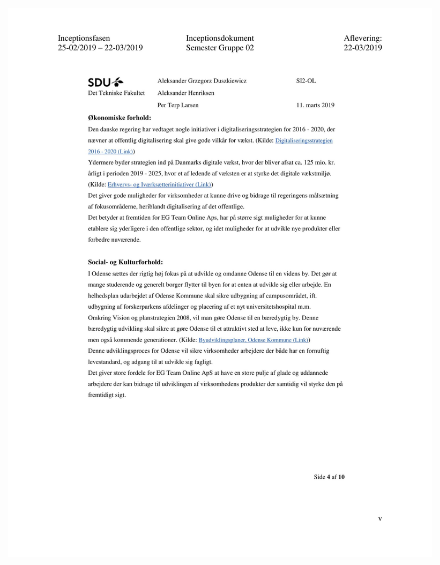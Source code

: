\begin{figure}[hb]
  \includegraphics[scale = 0.33]{./PNG/Inceptions/Gruppe02+InceptionsDokument-38.jpg} 
\end{figure}

